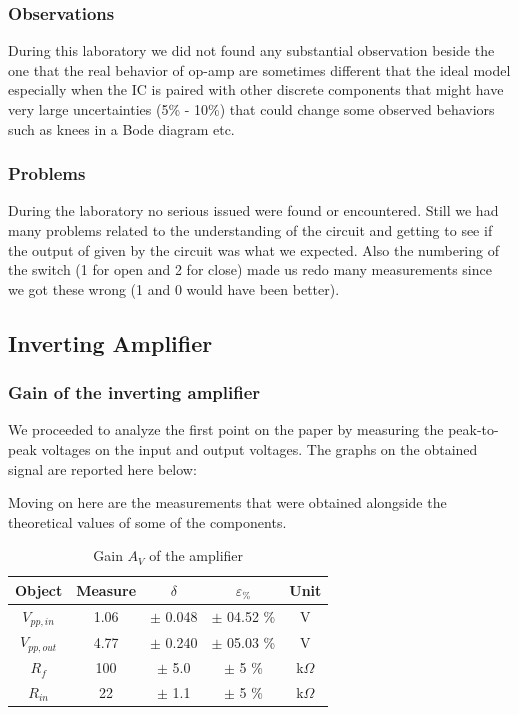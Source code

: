 \documentclass[../main.tex]{subfiles}
\begin{document}
\subsubsection*{Observations}

During this laboratory we did not found any substantial observation beside the one that the real behavior of op-amp are sometimes different that the ideal model especially when the IC is paired with other discrete components that might have very large uncertainties (5\% - 10\%) that could change some observed behaviors such as knees in a Bode diagram etc. 

\subsubsection*{Problems}

During the laboratory no serious issued were found or encountered. Still we had many problems related to the understanding of the circuit and getting to see if the output of given by the circuit was what we expected. Also the numbering of the switch (1 for open and 2 for close) made us redo many measurements since we got these wrong (1 and 0 would have been better). 

\subsection{Inverting Amplifier}

\subsubsection*{Gain of the inverting amplifier}

We proceeded to analyze the first point on the paper by measuring the peak-to-peak voltages on the input and output voltages.
The graphs on the obtained signal are reported here below:


Moving on here are the measurements that were obtained alongside the theoretical values of some of the components.


\begin{table}[h!]
\centering	

\begin{tabular}{ccccc}
\textbf{Object} & \textbf{Measure}   & \textbf{$\delta$} & \textbf{$\varepsilon_{\%}$} & \textbf{Unit} \\
\hline
$V_{pp,in}$  & 1.06 & $\pm$ 0.048  & $\pm$ 04.52 \% &  V \\ 
\hline
$V_{pp,out}$ & 4.77 & $\pm$ 0.240  & $\pm$ 05.03 \% &  V \\ 
\hline
$R_{f}$   &  100 & $\pm$  5.0  &  $\pm$ 5 \% & k$\Omega$ \\
\hline
$R_{in}$  &  22  & $\pm$ 1.1  &  $\pm$ 5 \% & k$\Omega$ \\

\end{tabular}
\caption*{Gain $A_{V}$ of the amplifier}
\end{table}
\end{document}
